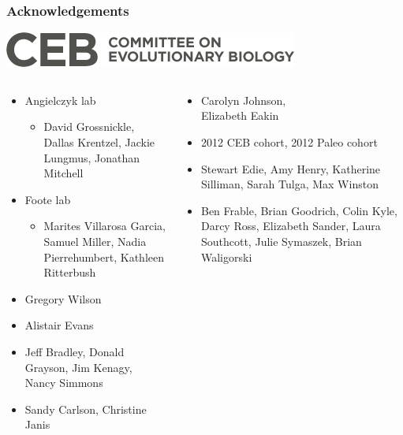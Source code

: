 \documentclass{beamer}
\begin{document}
\begin{frame}
  \frametitle{Acknowledgements}
  \begin{center}
    \includegraphics[width=\textwidth,height=0.1\textheight,keepaspectratio=true]{figure/ceb}
  \end{center}

  \begin{columns}
    \begin{column}{0.35\textwidth}
      \begin{itemize}
        \item \tiny{Angielczyk lab}
          \begin{itemize}
            \item \tiny{David Grossnickle, Dallas Krentzel, Jackie Lungmus, Jonathan Mitchell}
          \end{itemize}
        \item \tiny{Foote lab}
          \begin{itemize}
            \item \tiny{Marites Villarosa Garcia, Samuel Miller, Nadia Pierrehumbert, Kathleen Ritterbush}
          \end{itemize}
        \item \tiny{Gregory Wilson}
        \item \tiny{Alistair Evans}
        \item \tiny{Jeff Bradley, Donald Grayson, Jim Kenagy, Nancy Simmons}
        \item \tiny{Sandy Carlson, Christine Janis}
      \end{itemize}
    \end{column}
    \begin{column}{0.35\textwidth}
      \begin{itemize}
        \item \tiny{Carolyn Johnson, \\Elizabeth Eakin}
        \item \tiny{2012 CEB cohort, 2012 Paleo cohort}
        \item \tiny{\alert{Stewart Edie}, Amy Henry, Katherine Silliman, Sarah Tulga, Max Winston}
        \item \tiny{\alert{Ben Frable}, Brian Goodrich, Colin Kyle, \alert{Darcy Ross}, Elizabeth Sander, Laura Southcott, \alert{Julie Symaszek}, Brian Waligorski}

\end{itemize}
\end{column}
\end{columns}
\end{frame}
\end{document}

